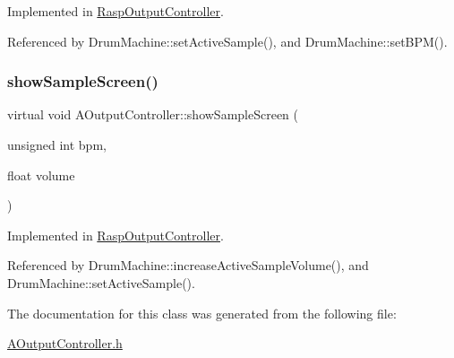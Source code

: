 Implemented in \hyperlink{class_rasp_output_controller_ad195a3d664b7c7e5680cd8949203c1fc}{Rasp\+Output\+Controller}.



Referenced by Drum\+Machine\+::set\+Active\+Sample(), and Drum\+Machine\+::set\+B\+P\+M().

\mbox{\label{class_a_output_controller_aab53d12a6aa6f38d0e4ead69e85ed4fe}} 
\subsubsection{\texorpdfstring{show\+Sample\+Screen()}{showSampleScreen()}}
{\footnotesize\ttfamily virtual void A\+Output\+Controller\+::show\+Sample\+Screen (\begin{DoxyParamCaption}\item[{unsigned int}]{bpm,  }\item[{float}]{volume }\end{DoxyParamCaption})\hspace{0.3cm}{\ttfamily [pure virtual]}}



Implemented in \hyperlink{class_rasp_output_controller_a613d3a1d1ceb31875be95e4a4b733fba}{Rasp\+Output\+Controller}.



Referenced by Drum\+Machine\+::increase\+Active\+Sample\+Volume(), and Drum\+Machine\+::set\+Active\+Sample().



The documentation for this class was generated from the following file\+:\begin{DoxyCompactItemize}
\item 
\hyperlink{_a_output_controller_8h}{A\+Output\+Controller.\+h}\end{DoxyCompactItemize}
